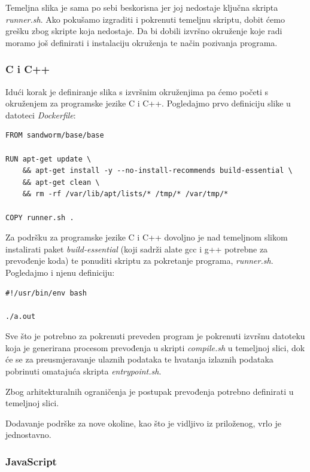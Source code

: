 \documentclass[times, utf8, zavrsni]{fer}
\begin{document}
Temeljna slika je sama po sebi beskorisna jer joj nedostaje ključna skripta {\textit{runner.sh}}. Ako pokušamo izgraditi i pokrenuti temeljnu skriptu, dobit ćemo grešku zbog skripte koja nedostaje. Da bi dobili izvršno okruženje koje radi moramo još definirati i instalaciju okruženja te način pozivanja programa.

\subsubsection{C i C++}

Idući korak je definiranje slika s izvršnim okruženjima pa ćemo početi s okruženjem za programske jezike C i C++. Pogledajmo prvo definiciju slike u datoteci {\textit{Dockerfile}}:

\begin{lstlisting}
FROM sandworm/base/base

RUN apt-get update \
    && apt-get install -y --no-install-recommends build-essential \
    && apt-get clean \
    && rm -rf /var/lib/apt/lists/* /tmp/* /var/tmp/*

COPY runner.sh .
\end{lstlisting}

Za podršku za programske jezike C i C++ dovoljno je nad temeljnom slikom instalirati paket {\textit{build-essential}} (koji sadrži alate gcc i g++ potrebne za prevođenje koda) te ponuditi skriptu za pokretanje programa, {\textit{runner.sh}}. Pogledajmo i njenu definiciju:

\begin{lstlisting}
#!/usr/bin/env bash

./a.out
\end{lstlisting}

Sve što je potrebno za pokrenuti preveden program je pokrenuti izvršnu datoteku koja je generirana procesom prevođenja u skripti {\textit{compile.sh}} u temeljnoj slici, dok će se za preusmjeravanje ulaznih podataka te hvatanja izlaznih podataka pobrinuti omatajuća skripta {\textit{entrypoint.sh}}.

Zbog arhitekturalnih ograničenja je postupak prevođenja potrebno definirati u temeljnoj slici. 

Dodavanje podrške za nove okoline, kao što je vidljivo iz priloženog, vrlo je jednostavno.

\subsubsection{JavaScript}
\end{document}
